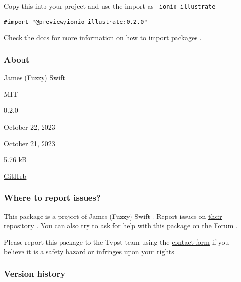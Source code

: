 Copy this into your project and use the import as
\texttt{\ ionio-illustrate\ }

\begin{verbatim}
#import "@preview/ionio-illustrate:0.2.0"
\end{verbatim}



Check the docs for
\href{https://typst.app/docs/reference/scripting/\#packages}{more
information on how to import packages} .

\subsubsection{About}\label{about}

\begin{description}
\tightlist
\item[Author :]
James (Fuzzy) Swift
\item[License:]
MIT
\item[Current version:]
0.2.0
\item[Last updated:]
October 22, 2023
\item[First released:]
October 21, 2023
\item[Archive size:]
5.76 kB
\href{https://packages.typst.org/preview/ionio-illustrate-0.2.0.tar.gz}{\pandocbounded{}}
\item[Repository:]
\href{https://github.com/JamesxX/ionio-illustrate}{GitHub}
\end{description}

\subsubsection{Where to report issues?}\label{where-to-report-issues}

This package is a project of James (Fuzzy) Swift . Report issues on
\href{https://github.com/JamesxX/ionio-illustrate}{their repository} .
You can also try to ask for help with this package on the
\href{https://forum.typst.app}{Forum} .

Please report this package to the Typst team using the
\href{https://typst.app/contact}{contact form} if you believe it is a
safety hazard or infringes upon your rights.

\label{versions}
\subsubsection{Version history}\label{version-history}

